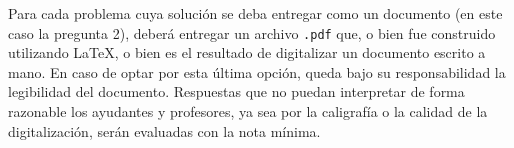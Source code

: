 
\bigskip

Para cada problema cuya solución se deba entregar como un documento (en este caso la pregunta 2), deberá entregar un archivo \texttt{.pdf} que, o bien fue construido utilizando \LaTeX, o bien es el resultado de digitalizar un documento escrito a mano. En caso de optar por esta última opción, queda bajo su responsabilidad la legibilidad del documento. Respuestas que no puedan interpretar de forma razonable los ayudantes y profesores, ya sea por la caligrafía o la calidad de la digitalización, serán evaluadas con la nota mínima.
